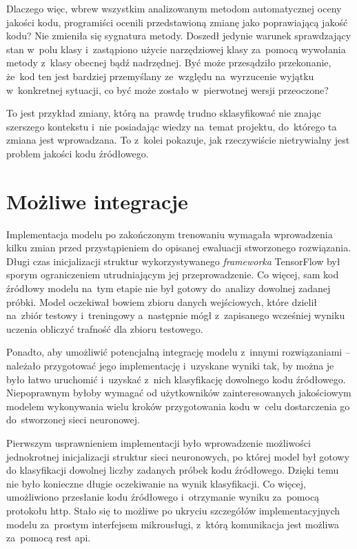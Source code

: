 \documentclass[twoside]{praca}
\begin{document}
Dlaczego więc, wbrew wszystkim analizowanym metodom automatycznej oceny jakości kodu, programiści ocenili przedstawioną zmianę jako poprawiającą jakość kodu? Nie zmieniła się sygnatura metody. Doszedł jedynie warunek sprawdzający stan w~polu klasy i~zastąpiono użycie narzędziowej klasy za~pomocą wywołania metody z~klasy obecnej bądź nadrzędnej. Być może przesądziło przekonanie, że~kod ten jest bardziej przemyślany ze~względu na~wyrzucenie wyjątku w~konkretnej sytuacji, co być może zostało w~pierwotnej wersji przeoczone?

To jest przykład zmiany, którą na~prawdę trudno sklasyfikować nie znając szerszego kontekstu i~nie posiadając wiedzy na~temat projektu, do~którego ta zmiana jest wprowadzana. To z~kolei pokazuje, jak rzeczywiście nietrywialny jest problem jakości kodu źródłowego.

\section{Możliwe integracje}

\label{sec:eval:microservice}

Implementacja modelu po zakończonym trenowaniu wymagała wprowadzenia kilku zmian przed przystąpieniem do opisanej ewaluacji stworzonego rozwiązania. Długi czas inicjalizacji struktur wykorzystywanego \textit{frameworka} TensorFlow był sporym ograniczeniem utrudniającym jej przeprowadzenie. Co więcej, sam kod źródłowy modelu na~tym etapie nie był gotowy do~analizy dowolnej zadanej próbki. Model oczekiwał bowiem zbioru danych wejściowych, które dzielił na~zbiór testowy i~treningowy a~następnie mógł z~zapisanego wcześniej wyniku uczenia obliczyć trafność dla zbioru testowego.

Ponadto, aby umożliwić potencjalną integrację modelu z~innymi rozwiązaniami -- należało przygotować jego implementację i~uzyskane wyniki tak, by można je było łatwo uruchomić i~uzyskać z~nich klasyfikację dowolnego kodu źródłowego. Niepoprawnym byłoby wymagać od użytkowników zainteresowanych jakościowym modelem wykonywania wielu kroków przygotowania kodu w~celu dostarczenia go do~stworzonej sieci neuronowej. 

Pierwszym usprawnieniem implementacji było wprowadzenie możliwości jednokrotnej inicjalizacji struktur sieci neuronowych, po której model był gotowy do klasyfikacji dowolnej liczby zadanych próbek kodu źródłowego. Dzięki temu nie było konieczne długie oczekiwanie na wynik klasyfikacji. Co więcej, umożliwiono przesłanie kodu źródłowego i~otrzymanie wyniku za~pomocą protokołu \gls{http}. Stało się to możliwe po ukryciu szczegółów implementacyjnych modelu za~prostym interfejsem mikrousługi, z~którą komunikacja jest możliwa za~pomocą \gls{rest} \gls{api}.
\end{document}
